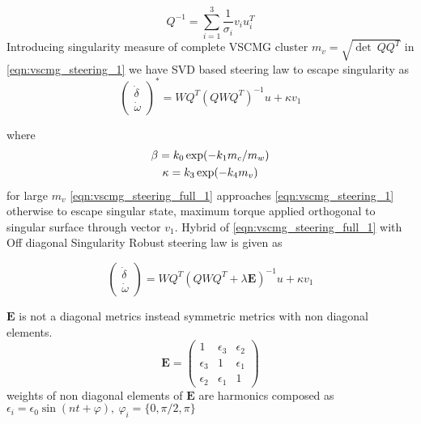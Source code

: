  
\begin{equation}
Q^{-1} =\sum ^{3}_{i=1}\frac{1}{\sigma _{i}} v_{i} u^{T}_{i}
\end{equation}
Introducing singularity measure of complete VSCMG cluster $\displaystyle m_{v} =\sqrt{\det \ QQ^{T}}$ in \autoref{eqn:vscmg_steering_1} we have SVD based steering law to escape singularity as
\begin{equation}
\begin{pmatrix}
\dot{\delta }\\
\dot{\omega }
\end{pmatrix}^{*} =WQ^{T}\left( QWQ^{T}\right)^{-1} u+\kappa v_{1}
\label{eqn:vscmg_steering_full_1}
\end{equation}

where 
\begin{gather}
\beta =k_{0}\exp( -k_{1} m_{c} /m_{w}) \notag\\
\kappa =k_{3}\exp( -k_{4} m_{v})
\end{gather}
for large $\displaystyle m_{v}$ \autoref{eqn:vscmg_steering_full_1} approaches \autoref{eqn:vscmg_steering_1} otherwise to escape singular state, maximum torque applied orthogonal to singular surface through vector $\displaystyle v_{1}$.
Hybrid of \autoref{eqn:vscmg_steering_full_1} with Off diagonal Singularity Robust steering law is given as
\begin{tcolorbox}
\begin{equation}
\begin{pmatrix}
\dot{\delta }\\
\dot{\omega }
\end{pmatrix} =WQ^{T}\left( QWQ^{T} +\lambda \mathbf{E}\right)^{-1} u+\kappa v_{1}
\label{eqn:vscmg_steering_full_HSR}
\end{equation}
\end{tcolorbox}

$\textbf{E}$ is not a diagonal metrics instead symmetric metrics with non diagonal elements.
\begin{equation}
\mathbf{E} =\begin{pmatrix}
1 & \epsilon _{3} & \epsilon _{2}\\
\epsilon _{3} & 1 & \epsilon _{1}\\
\epsilon _{2} & \epsilon _{1} &  1
\end{pmatrix}
\end{equation}
weights of non diagonal elements of $\textbf{E}$ are harmonics composed as
$\displaystyle \epsilon _{i} =\epsilon _{0}\sin( nt+\varphi ) ,\ \varphi _{i} =\{0,\pi /2,\pi \}$ 